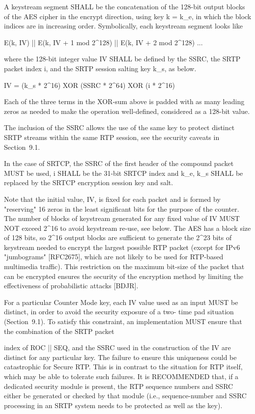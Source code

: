 \documentclass{article}
\begin{document}
A keystream segment SHALL be the concatenation of the 128-bit output blocks of the AES cipher in the encrypt direction, using key k = k\_e, in which the block indices are in increasing order.  Symbolically, each keystream segment looks like

E(k, IV) || E(k, IV + 1 mod 2\textasciicircum{}128) || E(k, IV + 2 mod 2\textasciicircum{}128) ...

where the 128-bit integer value IV SHALL be defined by the SSRC, the SRTP packet index i, and the SRTP session salting key k\_s, as below.

IV = (k\_s * 2\textasciicircum{}16) XOR (SSRC * 2\textasciicircum{}64) XOR (i * 2\textasciicircum{}16)

Each of the three terms in the XOR-sum above is padded with as many leading zeros as needed to make the operation well-defined, considered as a 128-bit value.

The inclusion of the SSRC allows the use of the same key to protect distinct SRTP streams within the same RTP session, see the security caveats in Section~9.1.

In the case of SRTCP, the SSRC of the first header of the compound packet MUST be used, i SHALL be the 31-bit SRTCP index and k\_e, k\_s SHALL be replaced by the SRTCP encryption session key and salt.

Note that the initial value, IV, is fixed for each packet and is formed by "reserving" 16 zeros in the least significant bits for the purpose of the counter.  The number of blocks of keystream generated for any fixed value of IV MUST NOT exceed 2\textasciicircum{}16 to avoid keystream re-use, see below.  The AES has a block size of 128 bits, so 2\textasciicircum{}16 output blocks are sufficient to generate the 2\textasciicircum{}23 bits of keystream needed to encrypt the largest possible RTP packet (except for IPv6 "jumbograms" [RFC2675], which are not likely to be used for RTP-based multimedia traffic).  This restriction on the maximum bit-size of the packet that can be encrypted ensures the security of the encryption method by limiting the effectiveness of probabilistic attacks [BDJR].

For a particular Counter Mode key, each IV value used as an input MUST be distinct, in order to avoid the security exposure of a two- time pad situation (Section~9.1).  To satisfy this constraint, an implementation MUST ensure that the combination of the SRTP packet

index of ROC || SEQ, and the SSRC used in the construction of the IV are distinct for any particular key.  The failure to ensure this uniqueness could be catastrophic for Secure RTP.  This is in contrast to the situation for RTP itself, which may be able to tolerate such failures.  It is RECOMMENDED that, if a dedicated security module is present, the RTP sequence numbers and SSRC either be generated or checked by that module (i.e., sequence-number and SSRC processing in an SRTP system needs to be protected as well as the key).
\end{document}
